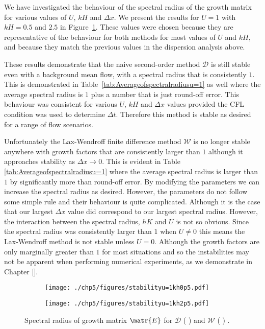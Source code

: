 We have investigated the behaviour of the spectral radius of the growth matrix for various values of $U$, $kH$ and $\Delta x$. We present the results for $U =1$ with $kH =0.5$ and $2.5$ in Figure~\ref{fig:Stabu=1}. These values were chosen because they are representative of the behaviour for both methods for most values of $U$ and $kH$, and because they match the previous values in the dispersion analysis above. 

These results demonstrate that the naive second-order method $\mathcal{D}$ is still stable even with a background mean flow, with a spectral radius that is consistently $1$. This is demonstrated in Table~\ref{tab:Averageofspectralradiusu=1} as well where the average spectral radius is $1$ plus a number that is just round-off error. This behaviour was consistent for various $U$, $kH$ and $\Delta x$ values provided the CFL condition was used to determine $\Delta t$. Therefore this method is stable as desired for a range of flow scenarios. 

Unfortunately the Lax-Wendroff finite difference method $\mathcal{W}$ is no longer stable anywhere with growth factors that are consistently larger than $1$ although it approaches stability as $\Delta x \rightarrow 0$. This is evident in Table \ref{tab:Averageofspectralradiusu=1} where the average spectral radius is larger than $1$ by significantly more than round-off error. By modifying the parameters we can increase the spectral radius as desired. However, the parameters do not follow some simple rule and their behaviour is quite complicated. Although it is the case that our largest $\Delta x$ value did correspond to our largest spectral radius. However, the interaction between the spectral radius, $hK$ and $U$ is not so obvious. Since the spectral radius was consistently larger than $1$ when $U \neq 0$ this means the Lax-Wendroff method is not stable unless $U=0$. Although the growth factors are only marginally greater than $1$ for most situations and so the instabilities may not be apparent when performing numerical experiments, as we demonstrate in Chapter []. 
\begin{figure}
	\centering
	\begin{subfigure}{0.5\textwidth}
		\texttt{[image: ./chp5/figures/stabilityu=1kh0p5.pdf]}
	\end{subfigure}%
	\begin{subfigure}{0.5\textwidth}
		\texttt{[image: ./chp5/figures/stabilityu=1kh2p5.pdf]}
	\end{subfigure}
	\caption{Spectral radius of growth matrix $\matr{E}$ for $\mathcal{D}$ ({\color{violet!80!white} \solidrule}) and $\mathcal{W}$ ({\color{orange} \solidrule}) .}
	\label{fig:Stabu=1}
\end{figure}


